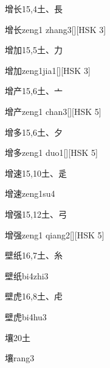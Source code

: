\begin{entry}{增长}{15,4}{⼟、⾧}
  \begin{phonetics}{增长}{zeng1 zhang3}[][HSK 3]
  \end{phonetics}
\end{entry}

\begin{entry}{增加}{15,5}{⼟、⼒}
  \begin{phonetics}{增加}{zeng1jia1}[][HSK 3]
  \end{phonetics}
\end{entry}

\begin{entry}{增产}{15,6}{⼟、⼇}
  \begin{phonetics}{增产}{zeng1 chan3}[][HSK 5]
  \end{phonetics}
\end{entry}

\begin{entry}{增多}{15,6}{⼟、⼣}
  \begin{phonetics}{增多}{zeng1 duo1}[][HSK 5]
  \end{phonetics}
\end{entry}

\begin{entry}{增速}{15,10}{⼟、⾡}
  \begin{phonetics}{增速}{zeng1su4}
  \end{phonetics}
\end{entry}

\begin{entry}{增强}{15,12}{⼟、⼸}
  \begin{phonetics}{增强}{zeng1 qiang2}[][HSK 5]
  \end{phonetics}
\end{entry}

\begin{entry}{壁纸}{16,7}{⼟、⽷}
  \begin{phonetics}{壁纸}{bi4zhi3}
  \end{phonetics}
\end{entry}

\begin{entry}{壁虎}{16,8}{⼟、⾌}
  \begin{phonetics}{壁虎}{bi4hu3}
  \end{phonetics}
\end{entry}

\begin{entry}{壤}{20}{⼟}
  \begin{phonetics}{壤}{rang3}
  \end{phonetics}
\end{entry}


